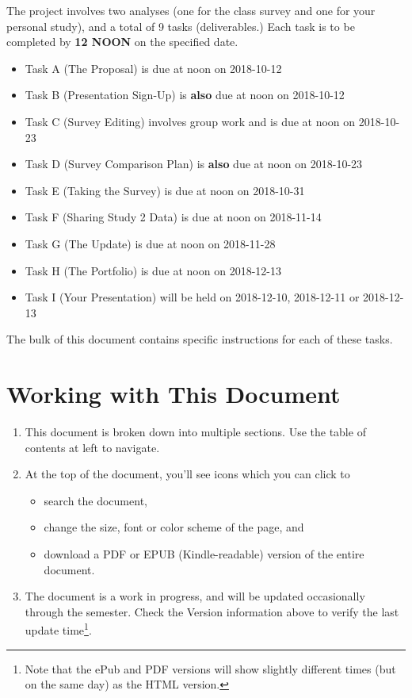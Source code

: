 \documentclass[]{book}
\providecommand{\tightlist}{%
  \setlength{\itemsep}{0pt}\setlength{\parskip}{0pt}}
\let\rmarkdownfootnote\footnote%
\def\footnote{\protect\rmarkdownfootnote}
\theoremstyle{definition}
\theoremstyle{definition}
\theoremstyle{definition}
\theoremstyle{remark}
\begin{document}
The project involves two analyses (one for the class survey and one for
your personal study), and a total of 9 tasks (deliverables.) Each task
is to be completed by \textbf{12 NOON} on the specified date.

\begin{itemize}
\tightlist
\item
  Task A (The Proposal) is due at noon on 2018-10-12
\item
  Task B (Presentation Sign-Up) is \textbf{also} due at noon on
  2018-10-12
\item
  Task C (Survey Editing) involves group work and is due at noon on
  2018-10-23
\item
  Task D (Survey Comparison Plan) is \textbf{also} due at noon on
  2018-10-23
\item
  Task E (Taking the Survey) is due at noon on 2018-10-31
\item
  Task F (Sharing Study 2 Data) is due at noon on 2018-11-14
\item
  Task G (The Update) is due at noon on 2018-11-28
\item
  Task H (The Portfolio) is due at noon on 2018-12-13
\item
  Task I (Your Presentation) will be held on 2018-12-10, 2018-12-11 or
  2018-12-13
\end{itemize}

The bulk of this document contains specific instructions for each of
these tasks.

\hypertarget{working-with-this-document}{%
\section*{Working with This Document}\label{working-with-this-document}}

\begin{enumerate}
\def\labelenumi{\arabic{enumi}.}
\tightlist
\item
  This document is broken down into multiple sections. Use the table of
  contents at left to navigate.
\item
  At the top of the document, you'll see icons which you can click to

  \begin{itemize}
  \tightlist
  \item
    search the document,
  \item
    change the size, font or color scheme of the page, and
  \item
    download a PDF or EPUB (Kindle-readable) version of the entire
    document.
  \end{itemize}
\item
  The document is a work in progress, and will be updated occasionally
  through the semester. Check the Version information above to verify
  the last update time\footnote{Note that the ePub and PDF versions will
    show slightly different times (but on the same day) as the HTML
    version.}.
\end{enumerate}
\end{document}
